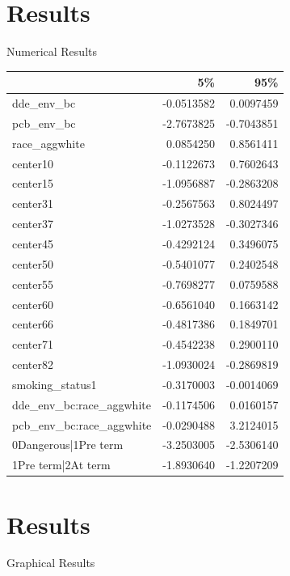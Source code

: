 \documentclass{beamer}\usepackage[]{graphicx}\usepackage[]{color}
\begin{document}
\section{Results}
\begin{frame}{Numerical Results}
\begin{tabular}{l|r|r}
\hline
  & 5\% & 95\%\\
\hline
dde\_env\_bc & -0.0513582 & 0.0097459\\
\hline
pcb\_env\_bc & -2.7673825 & -0.7043851\\
\hline
race\_aggwhite & 0.0854250 & 0.8561411\\
\hline
center10 & -0.1122673 & 0.7602643\\
\hline
center15 & -1.0956887 & -0.2863208\\
\hline
center31 & -0.2567563 & 0.8024497\\
\hline
center37 & -1.0273528 & -0.3027346\\
\hline
center45 & -0.4292124 & 0.3496075\\
\hline
center50 & -0.5401077 & 0.2402548\\
\hline
center55 & -0.7698277 & 0.0759588\\
\hline
center60 & -0.6561040 & 0.1663142\\
\hline
center66 & -0.4817386 & 0.1849701\\
\hline
center71 & -0.4542238 & 0.2900110\\
\hline
center82 & -1.0930024 & -0.2869819\\
\hline
smoking\_status1 & -0.3170003 & -0.0014069\\
\hline
dde\_env\_bc:race\_aggwhite & -0.1174506 & 0.0160157\\
\hline
pcb\_env\_bc:race\_aggwhite & -0.0290488 & 3.2124015\\
\hline
0Dangerous|1Pre term & -3.2503005 & -2.5306140\\
\hline
1Pre term|2At term & -1.8930640 & -1.2207209\\
\hline
\end{tabular}
\end{frame}
\section{Results}
\begin{frame}{Graphical Results}

\end{frame}
\end{document}
